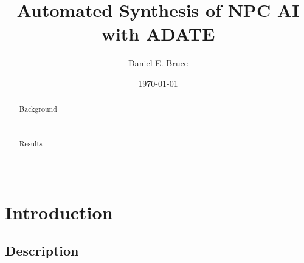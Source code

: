 \documentclass[]{report}
\begin{document}
\title{Automated Synthesis of NPC AI with ADATE}
\author{Daniel E. Bruce}
\date{\today}
\maketitle

\begin{abstract}
  \begin{description}
    \item[Background] \hfill \\

    \item[Results] \hfill \\

  \end{description}
\end{abstract}

\tableofcontents

\chapter{Introduction}
\section{Description}

{}

\end{document}
